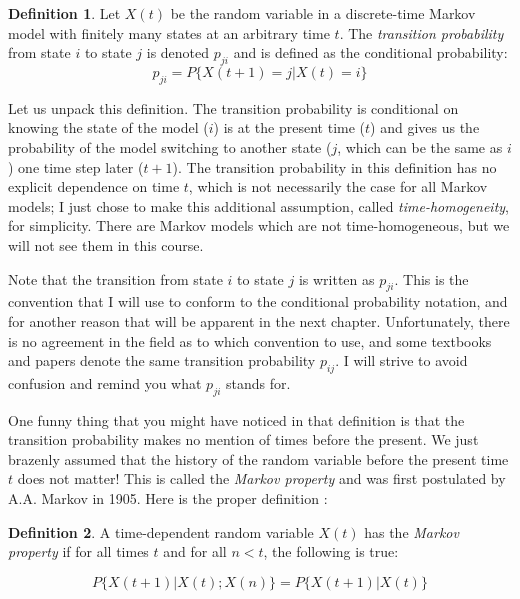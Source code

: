 \documentclass[
]{book}
\theoremstyle{definition}
\newtheorem{definition}{Definition}[chapter]
\theoremstyle{definition}
\theoremstyle{definition}
\theoremstyle{remark}
\begin{document}
\begin{definition}
\protect\hypertarget{def:def-mark-trans}{}{\label{def:def-mark-trans} }Let \(X(t)\) be the random variable in a discrete-time Markov model with finitely many states at an arbitrary time \(t\). The \emph{transition probability} from state \(i\) to state \(j\) is denoted \(p_{ji}\) and is defined as the conditional probability:
\[ p_{ji} = P \{X(t+1) = j | X(t) = i \}\]
\end{definition}

Let us unpack this definition. The transition probability is conditional on knowing the state of the model (\(i\)) is at the present time (\(t\)) and gives us the probability of the model switching to another state (\(j\), which can be the same as \(i\)) one time step later (\(t+1\)). The transition probability in this definition has no explicit dependence on time \(t\), which is not necessarily the case for all Markov models; I just chose to make this additional assumption, called \emph{time-homogeneity}, for simplicity. There are Markov models which are not time-homogeneous, but we will not see them in this course.

Note that the transition from state \(i\) to state \(j\) is written as \(p_{ji}\). This is the convention that I will use to conform to the conditional probability notation, and for another reason that will be apparent in the next chapter. Unfortunately, there is no agreement in the field as to which convention to use, and some textbooks and papers denote the same transition probability \(p_{ij}\). I will strive to avoid confusion and remind you what \(p_{ji}\) stands for.

One funny thing that you might have noticed in that definition is that the transition probability makes no mention of times before the present. We just brazenly assumed that the history of the random variable before the present time \(t\) does not matter! This is called the \emph{Markov property} and was first postulated by A.A. Markov in 1905. Here is the proper definition \citep{feller_introduction_????}:

\begin{definition}
\protect\hypertarget{def:def-mark-prop}{}{\label{def:def-mark-prop} }A time-dependent random variable \(X(t)\) has the \emph{Markov property} if for all times \(t\) and for all \(n<t\), the following is true:

\[P\{ X(t+1)| X(t) ; X(n) \} = P\{ X(t+1)| X(t) \}\]
\end{definition}
\end{document}
